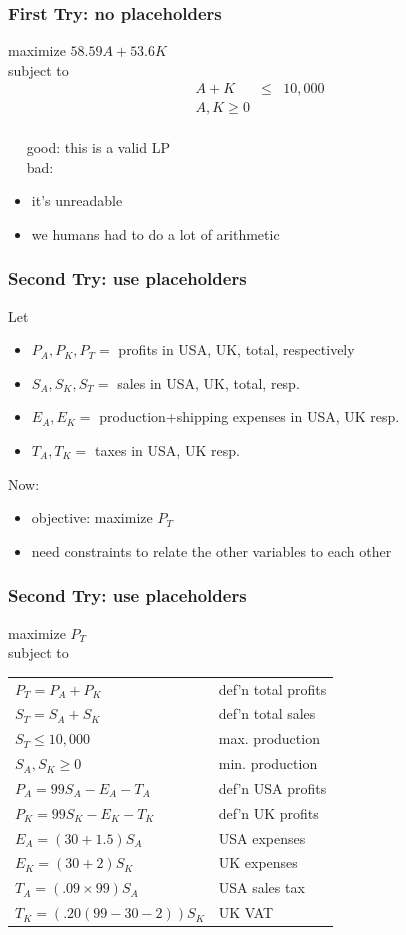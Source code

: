 \documentclass{beamer}
\newcommand{\stanza}{ \\~\ }
\begin{document}
\begin{frame} \frametitle{First Try: no placeholders}
  maximize $58.59A + 53.6K$ \\
  subject to
  \begin{eqnarray*}
    A + K &\leq& 10,000 \\
    A, K \geq 0
  \end{eqnarray*}
  \stanza
  good: this is a valid LP \stanza
  bad:
  \begin{itemize}
    \item it's unreadable
    \item we humans had to do a lot of arithmetic
  \end{itemize}
\end{frame}

\begin{frame} \frametitle{Second Try: use placeholders}
Let
\begin{itemize}
  \item $P_A, P_K, P_T = $ profits in USA, UK, total, respectively
  \item $S_A, S_K, S_T = $ sales in USA, UK, total, resp.
  \item $E_A, E_K = $ production+shipping expenses in USA, UK resp.
  \item $T_A, T_K = $ taxes in USA, UK resp.
\end{itemize}
Now:
\begin{itemize}
  \item objective: maximize $P_T$
  \item need constraints to relate the other variables to each other
\end{itemize}
\end{frame}

\begin{frame} \frametitle{Second Try: use placeholders}
  maximize $P_T$ \\
  subject to \\
  \begin{tabular}{ll}
    $P_T = P_A + P_K$ & def'n total profits \\
    $S_T = S_A + S_K$ & def'n total sales \\
    $S_T \leq 10,000$ & max. production \\
    $S_A, S_K \geq 0$ & min. production \\
    $P_A = 99S_A - E_A - T_A$ & def'n USA profits \\
    $P_K = 99S_K - E_K - T_K$ & def'n UK profits \\
    $E_A = (30+1.5) S_A$ & USA expenses \\
    $E_K = (30+2) S_K $ & UK expenses \\
    $T_A = (.09 \times 99) S_A$ & USA sales tax \\
    $T_K = (.20 (99-30-2)) S_K$ & UK VAT \\
  \end{tabular}
\end{frame}
\end{document}
